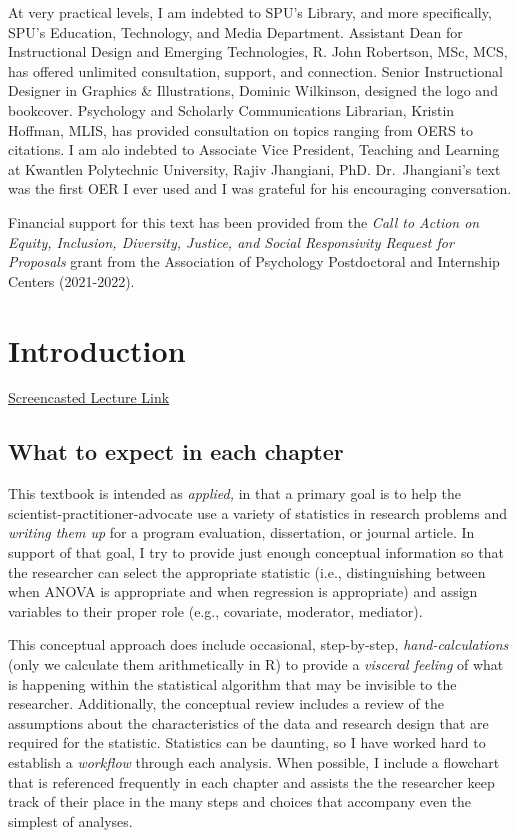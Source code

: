 \documentclass[
]{book}
\begin{document}
At very practical levels, I am indebted to SPU's Library, and more specifically, SPU's Education, Technology, and Media Department. Assistant Dean for Instructional Design and Emerging Technologies, R. John Robertson, MSc, MCS, has offered unlimited consultation, support, and connection. Senior Instructional Designer in Graphics \& Illustrations, Dominic Wilkinson, designed the logo and bookcover. Psychology and Scholarly Communications Librarian, Kristin Hoffman, MLIS, has provided consultation on topics ranging from OERS to citations. I am alo indebted to Associate Vice President, Teaching and Learning at Kwantlen Polytechnic University, Rajiv Jhangiani, PhD. Dr.~Jhangiani's text \citeyearpar{jhangiani_research_2019} was the first OER I ever used and I was grateful for his encouraging conversation.

Financial support for this text has been provided from the \emph{Call to Action on Equity, Inclusion, Diversity, Justice, and Social Responsivity
Request for Proposals} grant from the Association of Psychology Postdoctoral and Internship Centers (2021-2022).

\hypertarget{ReCintro}{%
\chapter{Introduction}\label{ReCintro}}

\href{https://spu.hosted.panopto.com/Panopto/Pages/Viewer.aspx?pid=cc9b7c0d-e5c3-4e4e-a469-acf7013ee761}{Screencasted Lecture Link}

\hypertarget{what-to-expect-in-each-chapter}{%
\section{What to expect in each chapter}\label{what-to-expect-in-each-chapter}}

This textbook is intended as \emph{applied,} in that a primary goal is to help the scientist-practitioner-advocate use a variety of statistics in research problems and \emph{writing them up} for a program evaluation, dissertation, or journal article. In support of that goal, I try to provide just enough conceptual information so that the researcher can select the appropriate statistic (i.e., distinguishing between when ANOVA is appropriate and when regression is appropriate) and assign variables to their proper role (e.g., covariate, moderator, mediator).

This conceptual approach does include occasional, step-by-step, \emph{hand-calculations} (only we calculate them arithmetically in R) to provide a \emph{visceral feeling} of what is happening within the statistical algorithm that may be invisible to the researcher. Additionally, the conceptual review includes a review of the assumptions about the characteristics of the data and research design that are required for the statistic. Statistics can be daunting, so I have worked hard to establish a \emph{workflow} through each analysis. When possible, I include a flowchart that is referenced frequently in each chapter and assists the the researcher keep track of their place in the many steps and choices that accompany even the simplest of analyses.
\end{document}
